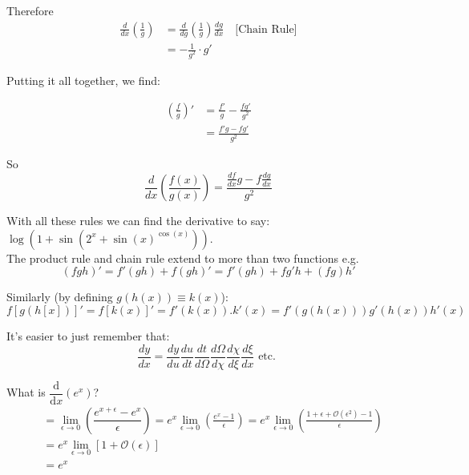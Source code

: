 \documentclass[twoside]{scrartcl}
\begin{document}
Therefore 
\[
\begin{aligned}
  \frac{d}{dx}\left(\frac{1}{g}\right) &= \frac{d}{dg}\left(\frac{1}{g}\right)\frac{dg}{dx} \quad \text{[Chain Rule]}\\
  &= -\frac{1}{g^2}\cdot g'
\end{aligned}
\]

Putting it all together, we find: 

\[
\begin{aligned}
  \left(\frac{f}{g}\right)' &= \frac{f'}{g} - \frac{fg'}{g^2}\\
  &= \frac{f'g - fg'}{g^2} 
\end{aligned}
\]

So 
\[\boxed{\frac{d}{dx}\left(\frac{f(x)}{g(x)}\right) = \frac{\frac{df}{dx}g - f\frac{dg}{dx}}{g^2}}\]

With all these rules we can find the derivative to say: $\log(1 + \sin(2^x + \sin(x)^{\cos(x)}))$.\\

















The product rule and chain rule extend to more than two functions e.g. 
\[(fgh)' = f'(gh) + f(gh)' = f'(gh) + fg'h + (fg)h'\]

Similarly (by defining $g(h(x)) \equiv k(x)$):\\
 \[f[g(h[x])]' = f[k(x)]' = f'(k(x)).k'(x) = f'(g(h(x)))g'(h(x))h'(x)\]
 
 It's easier to just remember that:
 \[\displaystyle{
 \frac{dy}{dx} = 
 \frac{dy}{du}
 \frac{du}{dt}
 \frac{dt}{d\Omega}
 \frac{d\Omega}{d\chi}
 \frac{d\chi}{d\xi}
 \frac{d\xi}{dx}   
 } \text{ etc. }\]
 
\vspace*{5pt}

\begin{example}
What is $\dfrac{\mathrm{d}}{\mathrm{d}x} (e^x)$?
\[
\begin{aligned}
&= 
\lim_{\epsilon \to 0} 
\left(\dfrac{e^{x + \epsilon} - e^x}{\epsilon}\right) 
= e^x \lim_{\epsilon \to 0}
\left(\frac{e^x - 1}{\epsilon}\right) 
= e^x \lim_{\epsilon \to 0} 
\left(\frac{1 + \epsilon + \mathcal{O}(\epsilon ^2) -1}{\epsilon} \right) \\
&= e^x \lim_{\epsilon \to 0} 
[1 + \mathcal{O}(\epsilon)]\\
& = e^x
\end{aligned}
\]
\end{example}
\end{document}

